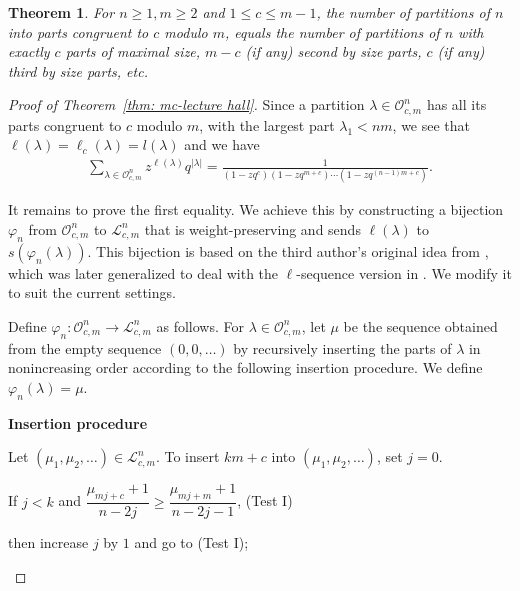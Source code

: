 \documentclass[11pt,reqno]{amsart}
\numberwithin{equation}{section}
\theoremstyle{plain}
\newtheorem{theorem}{Theorem}[section]
\theoremstyle{definition}
\newcommand{\OO}{\mathcal{O}}
\newcommand{\LL}{\mathcal{L}}
\begin{document}
\begin{theorem}
For $n\ge 1, m\ge 2$ and $1\le c\le m-1$, the number of partitions of $n$ into parts congruent to $c$ modulo $m$, equals the number of partitions of $n$ with exactly $c$ parts of maximal size, $m-c$ (if any) second by size parts, $c$ (if any) third by size parts, etc.
\end{theorem}

\begin{proof}[Proof of Theorem~\ref{thm: mc-lecture hall}]


Since a partition $\lambda\in\OO_{c,m}^n$ has all its parts congruent to $c$ modulo $m$, with the largest part $\lambda_1<nm$, we see that $\ell(\lambda)=\ell_c(\lambda)=l(\lambda)$ and we have
\begin{align*}
\sum_{\lambda\in\OO_{c,m}^{n}}z^{\ell(\lambda)}q^{|\lambda|}=\frac{1}{(1-zq^c)(1-zq^{m+c})\cdots(1-zq^{(n-1)m+c})}.
\end{align*}

It remains to prove the first equality. We achieve this by constructing a bijection $\varphi_n$ from $\OO_{c,m}^n$ to $\LL_{c,m}^n$ that is weight-preserving and sends $\ell(\lambda)$ to $s(\varphi_n(\lambda))$. This bijection is based on the third author's original idea from \cite{Yee}, which was later generalized to deal with the $\ell$-sequence version in \cite{SY}. We modify it to suit the current settings.

Define
$\varphi_n: \OO_{c,m}^n \longrightarrow \LL_{c,m}^n$ as follows.
For $\lambda\in \OO_{c,m}^n$, 
let $\mu$ be the sequence obtained from the empty sequence $(0,0,\ldots)$ by recursively inserting the parts of $\lambda$ in nonincreasing order according to the following insertion procedure. 
We define $\varphi_n(\lambda)=\mu$.

\begin{framed}
\begin{center}
{\bf Insertion procedure}
\end{center}


 



\noindent Let $(\mu_1, \mu_2,\ldots) \in \LL_{c,m}^n$.  To insert $km+c$ into $(\mu_1,\mu_2,\ldots)$, set $j=0$. \hfill





If $j<k$ and $\dfrac{\mu_{mj+c}+1}{n-2j}\ge \dfrac{\mu_{mj+m}+1}{n-2j-1}$, \hfill (Test I)

\hskip 0.2in then increase $j$ by $1$ and go to (Test I); \hfill


\end{framed}
\end{proof}
\end{document}
